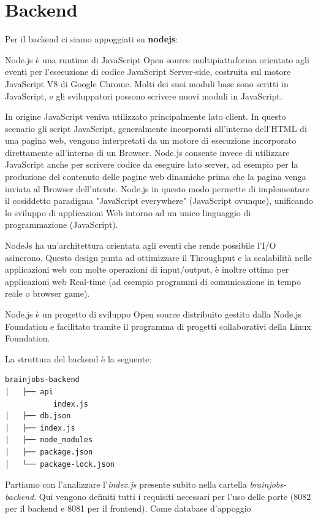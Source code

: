 \documentclass[a4paper,12pt, oneside]{book}
\begin{document}
\chapter{Backend}
Per il backend ci siamo appoggiati su \textbf{nodejs}:
\begin{shaded}
Node.js è una runtime di JavaScript Open source multipiattaforma orientato agli eventi per l'esecuzione di codice JavaScript Server-side, costruita sul motore JavaScript V8 di Google Chrome. Molti dei suoi moduli base sono scritti in JavaScript, e gli sviluppatori possono scrivere nuovi moduli in JavaScript.

In origine JavaScript veniva utilizzato principalmente lato client. In questo scenario gli script JavaScript, generalmente incorporati all'interno dell'HTML di una pagina web, vengono interpretati da un motore di esecuzione incorporato direttamente all'interno di un Browser. Node.js consente invece di utilizzare JavaScript anche per scrivere codice da eseguire lato server, ad esempio per la produzione del contenuto delle pagine web dinamiche prima che la pagina venga inviata al Browser dell'utente. Node.js in questo modo permette di implementare il cosiddetto paradigma "JavaScript everywhere" (JavaScript ovunque), unificando lo sviluppo di applicazioni Web intorno ad un unico linguaggio di programmazione (JavaScript).

NodeJs ha un'architettura orientata agli eventi che rende possibile l’I/O asincrono. Questo design punta ad ottimizzare il Throughput e la scalabilità nelle applicazioni web con molte operazioni di input/output, è inoltre ottimo per applicazioni web Real-time (ad esempio programmi di comunicazione in tempo reale o browser game).

Node.js è un progetto di sviluppo Open source distribuito gestito dalla Node.js Foundation e facilitato tramite il programma di progetti collaborativi della Linux Foundation. 
\end{shaded}
\newpage
La struttura del backend è la seguente:
\begin{shaded}
\begin{verbatim}
brainjobs-backend
│   ├── api
           index.js
│   ├── db.json
│   ├── index.js
│   ├── node_modules
│   ├── package.json
│   └── package-lock.json
\end{verbatim}
\end{shaded}
Partiamo con l'analizzare l'\textit{index.js} presente subito nella cartella \textit{brainjobs-backend}.
Qui vengono definiti tutti i requisiti necessari per l'uso
delle porte (8082 per il backend e 8081 per il frontend). Come database d'appoggio
\end{document}
